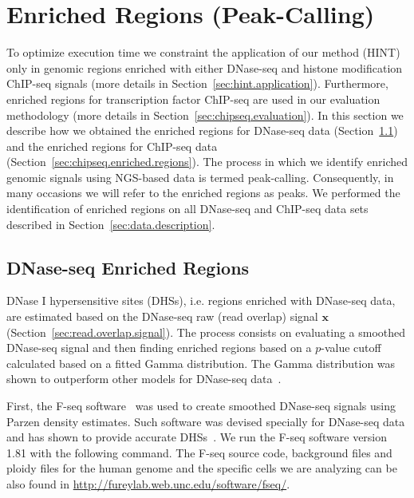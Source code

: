 \section{Enriched Regions (Peak-Calling)}
\label{sec:enriched.regions}

To optimize execution time we constraint the application of our method (HINT) only in genomic regions enriched with either DNase-seq and histone modification ChIP-seq signals (more details in Section~\ref{sec:hint.application}). Furthermore, enriched regions for transcription factor ChIP-seq are used in our evaluation methodology (more details in Section~\ref{sec:chipseq.evaluation}). In this section we describe how we obtained the enriched regions for DNase-seq data (Section~\ref{sec:dnaseseq.enriched.regions}) and the enriched regions for ChIP-seq data (Section~\ref{sec:chipseq.enriched.regions}). The process in which we identify enriched genomic signals using NGS-based data is termed peak-calling. Consequently, in many occasions we will refer to the enriched regions as peaks. We performed the identification of enriched regions on all DNase-seq and ChIP-seq data sets described in Section~\ref{sec:data.description}.

\subsection{DNase-seq Enriched Regions}
\label{sec:dnaseseq.enriched.regions}

DNase I hypersensitive sites (DHSs), i.e. regions enriched with DNase-seq data, are estimated based on the DNase-seq raw (read overlap) signal $\mathbf{x}$ (Section~\ref{sec:read.overlap.signal}). The process consists on evaluating a smoothed DNase-seq signal and then finding enriched regions based on a $p$-value cutoff calculated based on a fitted Gamma distribution. The Gamma distribution was shown to outperform other models for DNase-seq data~\cite{boyle2008b}.

First, the F-seq software~\cite{boyle2008b} was used to create smoothed DNase-seq signals using Parzen density estimates. Such software was devised specially for DNase-seq data and has shown to provide accurate DHSs~\cite{boyle2008b,boyle2011}. We run the F-seq software version 1.81 with the following command. The F-seq source code, background files and ploidy files for the human genome and the specific cells we are analyzing can be also found in \url{http://fureylab.web.unc.edu/software/fseq/}.

